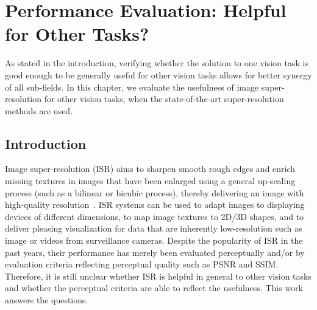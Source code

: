 \chapter{Performance Evaluation: Helpful for Other Tasks?}
\label{ch:SR4VT}

As stated in the introduction, verifying whether the solution to one vision task is good enough to be generally useful for other vision tasks allows for better synergy of all sub-fields.   In this chapter, we evaluate the usefulness of image super-resolution for other vision tasks, when the state-of-the-art super-resolution methods are used. 

\section{Introduction}

Image super-resolution (ISR) aims to sharpen smooth rough edges and
enrich missing textures in images that have been enlarged using a
general up-scaling process (such as a bilinear or bicubic process),
thereby delivering an image with high-quality
resolution~\citep{Freeman-CGA-2002, Yang-TIP-2010, Zeyde-CS-2012,
  Timofte-ICCV-2013, Dong-ECCV-2014, JOR:EG15}. ISR systems can be
used to adapt images to displaying devices of different dimensions, to
map image textures to 2D/3D shapes, and to deliver pleasing
visualization for data that are inherently low-resolution such as
image or videos from surveillance cameras.  Despite the popularity of
ISR in the past years, their performance has merely been evaluated
perceptually and/or by evaluation criteria reflecting perceptual
quality such as PSNR and SSIM. Therefore, it is still unclear whether
ISR is helpful in general to other vision tasks and whether the
perceptual criteria are able to reflect the usefulness. 
This work answers the questions.

